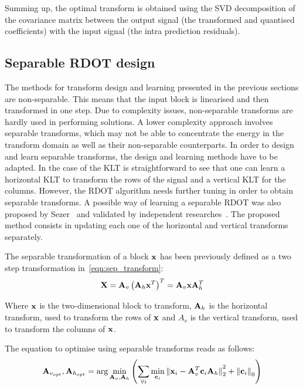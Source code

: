 \documentclass[11pt,a4paper,openright,twoside]{book}
\numberwithin{equation}{section} %
\numberwithin{figure}{section} %
\numberwithin{table}{section} %
\begin{document}
Summing up, the optimal transform is obtained using the SVD decomposition of
the covariance matrix between the output signal (the transformed and quantised
coefficients) with the input signal (the intra prediction residuals).

\subsection{Separable \acs{RDOT} design}
\label{sub:separable_rdot_design}

The methods for transform design and learning presented in the previous
sections are non-separable.
This means that the input block is linearised and then transformed in
one step.
Due to complexity issues, non-separable transforms are hardly used in
performing solutions.
A lower complexity approach involves separable transforms, which may not be
able to concentrate the energy in the transform domain as well as their
non-separable counterparts.
In order to design and learn separable transforms, the design and learning
methods have to be adapted.
In the case of the \ac{KLT} is straightforward to see that one can learn
a horizontal \ac{KLT} to transform the rows of the signal and a vertical
\ac{KLT} for the columns.
However, the \ac{RDOT} algorithm needs further tuning in order to obtain
separable transforms.
A possible way of learning a separable \ac{RDOT} was also proposed by
Sezer~\cite{sezer-11-phd} and validated by independent
researches~\cite{sole-09-sparsity-optimisation-separable-transforms}.
The proposed method consists in updating each one of the horizontal and
vertical transforms separately.

The separable transformation of a block $\mathbf{x}$ has been previously defined as a
two step transformation in~\eqref{eqn:sep_transform}:
\begin{equation*}
  \mathbf{X} = {\mathbf{A}_v\left( \mathbf{A}_h \mathbf{x}^T \right)}^T = \mathbf{A}_v \mathbf{x} \mathbf{A}_h^T
\end{equation*}

Where $\mathbf{x}$ is the two-dimensional block to transform, $\mathbf{A}_h$ is the horizontal
transform, used to transform the rows of $\mathbf{x}$ and $A_v$ is the vertical
transform, used to transform the columns of $\mathbf{x}$.

The equation to optimise using separable transforms reads as follows:
\begin{equation}
	\mathbf{A}_{v_{opt}}, \mathbf{A}_{h_{opt}} = \text{arg}\min\limits_{\mathbf{A}_v,\mathbf{A}_h}
	\left(
	\sum_{\forall i} \min\limits_{\mathbf{c}_i}{\Vert \mathbf{x}_i - \mathbf{A}_v^T\mathbf{c}_i\mathbf{A}_h \Vert}_2^2
	+ {\Vert \mathbf{c}_i \Vert}_0
	\right)
	\label{eqn:rdot-sep}
\end{equation}
\end{document}
